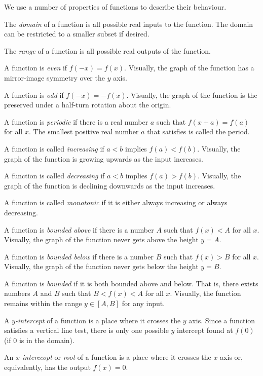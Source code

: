 \documentclass[fleqn]{report}
\begin{document}
We use a number of properties of functions to describe their
behaviour.
\begin{smallitemize}
\item The \emph{domain} of a function is all possible real
inputs to the function. The domain can be
restricted to a smaller subset if desired.
\item The \emph{range} of a function is all possible real
outputs of the function.
\item A function is \emph{even} if $f(-x) = f(x)$. Visually,
the graph of the function has a mirror-image symmetry over the
$y$ axis.
\item A function is \emph{odd} if $f(-x) = -f(x)$. Visually,
the graph of the function is the preserved under a half-turn
rotation about the origin.
\item A function is \emph{periodic} if there is a real number
$a$ such that $f(x+a) = f(a)$ for all $x$. The smallest positive
real number $a$ that satisfies is called the period.
\item A function is called \emph{increasing} if $a<b$ implies $f(a) <
f(b)$. Visually, the graph of the function is growing upwards
as the input increases. 
\item A function is called \emph{decreasing} if $a<b$ implies
$f(a) > f(b)$. Visually, the graph of the function is
declining downwards as the input increases.
\item A function is called \emph{monotonic} if it is either
always increasing or always decreasing. 
\item A function is \emph{bounded above} if there is a number $A$
such that $f(x) < A$ for all $x$. Visually, the graph of the
function never gets above the height $y=A$.
\item A function is \emph{bounded below} if there is a number $B$
such that $f(x) > B$ for all $x$. Visually, the graph of the
function never gets below the height $y=B$.
\item A function is \emph{bounded} if it is both bounded above and
below. That is, there exists numbers $A$ and $B$ such that $B
< f(x) < A$ for all $x$. Visually, the function remains
within the range $y \in [A,B]$ for any input.
\item A \emph{$y$-intercept} of a function is a place where it
crosses the $y$ axis. Since a function satisfies a vertical
line test, there is only one possible $y$ intercept found at
$f(0)$ (if $0$ is in the domain).
\item An \emph{$x$-interceopt} or \emph{root} of a function is
a place where it crosses the $x$ axis or, equivalently, has
the output $f(x) = 0$. 
\end{smallitemize}
\end{document}
